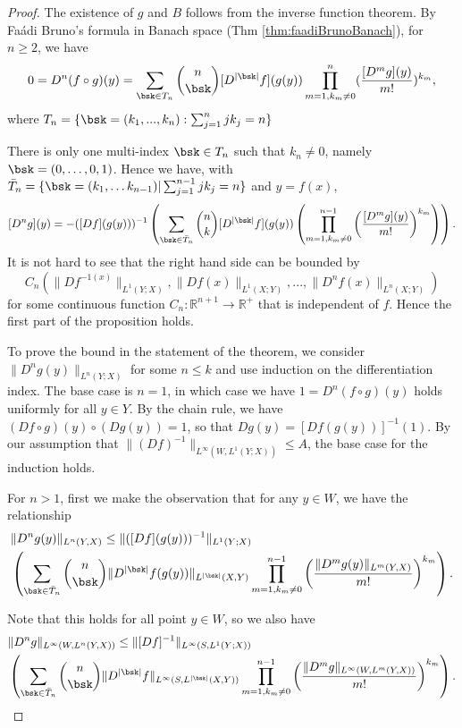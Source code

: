\begin{proof}
The existence of $g$ and $B$ follows from the inverse function theorem. By Fa\'{a}di Bruno's formula in Banach space (Thm \ref{thm:faadiBrunoBanach}), for $n \geq 2$, we have $$0 = D^n(f\circ g)(y) = \sum_{\bsk\in T_n}{n \choose \bsk}[D^{|\bsk|}f](g(y))\prod_{m=1, k_m\neq 0}^n(\frac{[D^m g](y)}{m!})^{k_m},$$ where $T_n = \{\bsk = (k_1,...,k_n) : \sum_{j=1}^n jk_j = n\}$

There is only one multi-index $\bsk \in T_n$ such that $k_n \neq 0$, namely $\bsk = (0,\ldots,0,1)$. Hence we have, with $\Bar{T}_n = \{\bsk = (k_1,\ldots k_{n-1})|\sum_{j=1}^{n-1}jk_j=n\}$ and $y=f(x)$, 
$$
[D^ng](y) = -([Df](g(y)))^{-1} \left ( \sum_{\bsk\in \bar{T}_n}{n \choose k}[D^{|\bsk|}f](g(y)) \left( \prod_{m=1, k_m\neq 0}^{n-1} \left (\frac{[D^m g](y)}{m!} \right )^{k_m}\right)\right).
$$ 
%
It is not hard to see that the right hand side can be bounded by $$C_n(\|Df^{-1(x)}\|_{L^1(Y;X)}, \|Df(x)\|_{L^1(X;Y)},..., \|D^nf(x)\|_{L^n(X;Y)})$$ for some continuous function $C_n:\mathbb{R}^{n+1}\rightarrow\mathbb{R}^+$ that is independent of $f$. Hence the first part of the proposition holds. 


To prove the bound in the statement of the theorem, we consider $\|D^ng(y)\|_{L^n(Y;X)}$ for some $n\leq k$ and use induction on the differentiation index. The base case is $n = 1$, in which case we have $1 = D^n(f\circ g)(y)$ holds uniformly for all $y \in Y$. By the chain rule, we have $(Df\circ g)(y)\circ (Dg(y)) = 1$, so that $Dg(y) = [Df (g(y))]^{-1}(1).$ By our assumption that  $\|(Df)^{-1}\|_{L^\infty(W, L^1(Y;X))} \leq A$, the base case for the induction holds.  

For $n > 1$, first we make the observation that for any $y\in W$, we have the relationship 
\begin{align*}
&\|D^ng(y)\|_{L^n(Y,X)} \leq\|([Df](g(y)))^{-1}\|_{L^1(Y;X)}\\ &\left ( \sum_{\bsk\in \bar{T}_n}{n \choose \bsk}\|D^{|\bsk|}f(g(y))\|_{L^{|\bsk|}(X,Y)} \prod_{m=1, k_m\neq 0}^{n-1} \left (\frac{\|D^m g(y)\|_{L^m(Y,X)}}{m!} \right )^{k_m}\right).    
\end{align*}

Note that this holds for all point $y\in W$, so we also have 
\begin{align*}
&\|D^ng\|_{L^\infty(W,L^n(Y,X))} \leq\|[Df]^{-1}\|_{L^\infty(S, L^1(Y;X))}\\ &\left ( \sum_{\bsk\in \bar{T}_n}{n \choose \bsk}\|D^{|\bsk|}f\|_{L^\infty(S, L^{|\bsk|}(X,Y))} \prod_{m=1, k_m\neq 0}^{n-1} \left (\frac{\|D^m g\|_{L^\infty(W,L^m(Y,X))}}{m!} \right )^{k_m}\right).    
\end{align*}





\end{proof}
